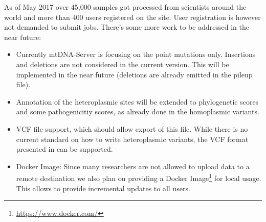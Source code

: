 As of May 2017 over 45,000 samples got processed from scientists around the world and more than 400 users registered on the site. User registration is however not demanded to submit jobs. There's some more work to be addressed in the near future:
\begin{itemize}
\item Currently mtDNA-Server is focusing on the point mutations only. Insertions and deletions are not considered in the current version. This will be implemented in the near future (deletions are already emitted in the pileup file).
\item Annotation of the heteroplasmic sites will be extended to phylogenetic scores and some pathogenicitiy scores, as already done in the homoplasmic variants. 
\item VCF file support, which should allow export of this file. While there is no current standard on how to write heteroplasmic variants, the VCF format presented in \cite{Calabrese2014} can be supported.
\item Docker Image: Since many researchers are not allowed to upload data to a remote destination we also plan on providing a Docker Image\footnote{\url{https://www.docker.com/}} for local usage. This allows to provide incremental updates to all users.  
\end{itemize}







